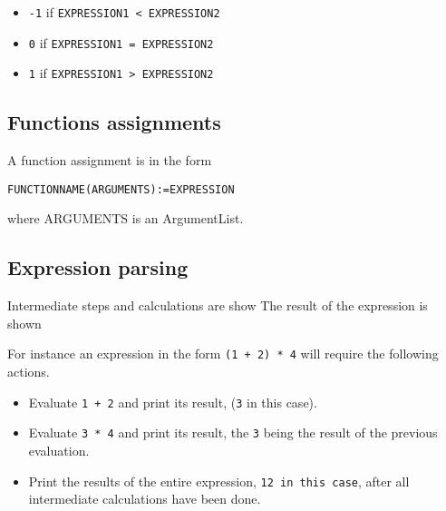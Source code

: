 \documentclass[11pt,a4paper]{article}
\begin{document}
\begin{itemize}
\item \texttt{-1} if \texttt{EXPRESSION1 < EXPRESSION2}
\item \texttt{0} if \texttt{EXPRESSION1 = EXPRESSION2}
\item \texttt{1} if \texttt{EXPRESSION1 > EXPRESSION2}
\end{itemize}

\subsection{Functions assignments}
A function assignment is in the form

\texttt{FUNCTIONNAME(ARGUMENTS):=EXPRESSION}

where ARGUMENTS is an ArgumentList.
\subsection{Expression parsing}
Intermediate steps and calculations are show
The result of the expression is shown

For instance an expression in the form \texttt{(1 + 2) * 4} will require the following actions.

\begin{itemize}
\item Evaluate \texttt{1 + 2} and print its result, (\texttt{3} in this case).
\item Evaluate \texttt{3 * 4} and print its result, the \texttt{3} being the result of the previous evaluation.
\item Print the results of the entire expression, \texttt{12 in this case}, after all intermediate calculations have been done.
\end{itemize}
\end{document}
